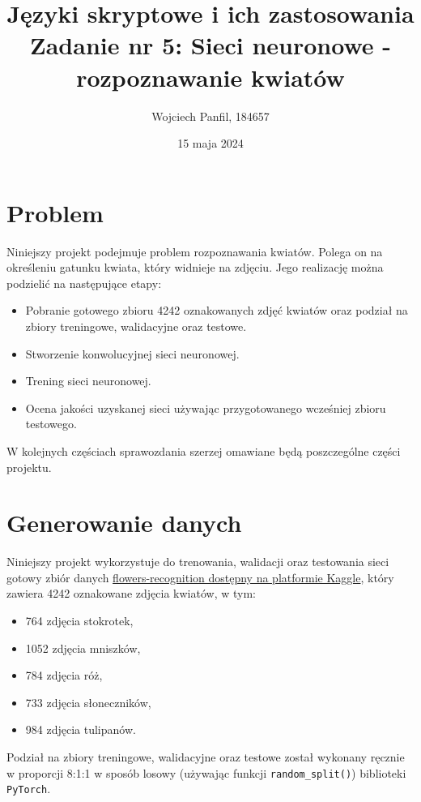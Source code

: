 \documentclass[11pt]{article}
\title{
	\textbf{Języki skryptowe i ich zastosowania}\\
	Zadanie nr 5: Sieci neuronowe - rozpoznawanie kwiatów}
\author{Wojciech Panfil, 184657}
\date{15 maja 2024}
\begin{document}
	\maketitle

	\section{Problem}
	Niniejszy projekt podejmuje problem rozpoznawania kwiatów. Polega on na określeniu
	gatunku kwiata, który widnieje na zdjęciu. Jego realizację można podzielić na następujące etapy:
	\begin{itemize}
		\item Pobranie gotowego zbioru 4242 oznakowanych zdjęć kwiatów oraz podział na zbiory treningowe, walidacyjne oraz testowe.
		\item Stworzenie konwolucyjnej sieci neuronowej.
		\item Trening sieci neuronowej.
		\item Ocena jakości uzyskanej sieci używając przygotowanego wcześniej zbioru testowego.
	\end{itemize}

	W kolejnych częściach sprawozdania szerzej omawiane będą poszczególne części projektu.

	\section{Generowanie danych}
	Niniejszy projekt wykorzystuje do trenowania, walidacji oraz testowania sieci gotowy
	zbiór danych \href{https://www.kaggle.com/datasets/alxmamaev/flowers-recognition}{flowers-recognition dostępny na platformie Kaggle},
	który zawiera 4242 oznakowane zdjęcia kwiatów, w tym:
	\begin{itemize}
		\item 764 zdjęcia stokrotek,
		\item 1052 zdjęcia mniszków,
		\item 784 zdjęcia róż,
		\item 733 zdjęcia słoneczników,
		\item 984 zdjęcia tulipanów.
	\end{itemize}
	Podział na zbiory treningowe, walidacyjne oraz testowe został wykonany ręcznie w proporcji 8:1:1 w sposób losowy
	(używając funkcji \texttt{random\_split()}) biblioteki \texttt{PyTorch}.
\end{document}
